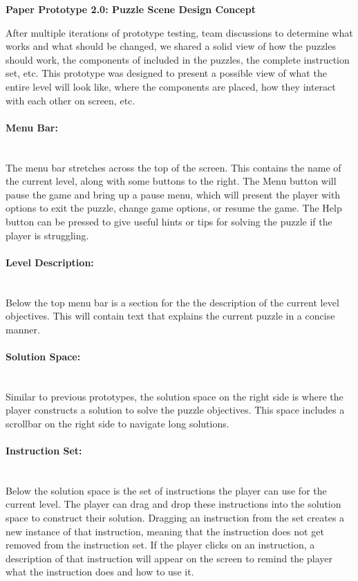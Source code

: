 \textbf{Paper Prototype 2.0: Puzzle Scene Design Concept}

After multiple iterations of prototype testing, team discussions to determine what works and what should be changed, we shared a solid view of how the puzzles should work, the components of included in the puzzles, the complete instruction set, etc.
This prototype was designed to present a possible view of what the entire level will look like, where the components are placed, how they interact with each other on screen, etc.




\paragraph{Menu Bar:} ~\\
The menu bar stretches across the top of the screen. This contains the name of the current level, along with some buttons to the right.
The Menu button will pause the game and bring up a pause menu, which will present the player with options to exit the puzzle, change game options, or resume the game.
The Help button can be pressed to give useful hints or tips for solving the puzzle if the player is struggling.


\paragraph{Level Description:} ~\\
Below the top menu bar is a section for the the description of the current level objectives. This will contain text that explains the current puzzle in a concise manner.


\paragraph{Solution Space:} ~\\
Similar to previous prototypes, the solution space on the right side is where the player constructs a solution to solve the puzzle objectives. This space includes a scrollbar on the right side to navigate long solutions.


\paragraph{Instruction Set:} ~\\
Below the solution space is the set of instructions the player can use for the current level.
The player can drag and drop these instructions into the solution space to construct their solution.
Dragging an instruction from the set creates a new instance of that instruction, meaning that the instruction does not get removed from the instruction set.
If the player clicks on an instruction, a description of that instruction will appear on the screen to remind the player what the instruction does and how to use it.



